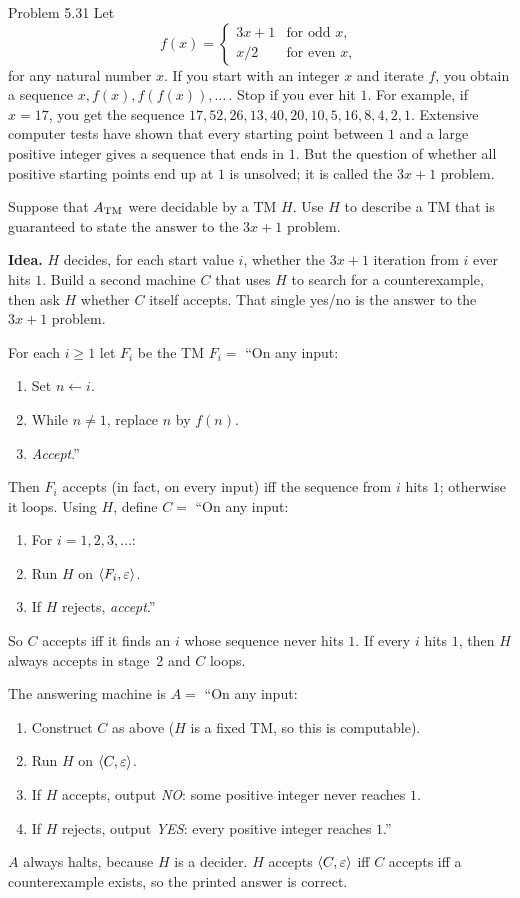 \begin{question}{Problem 5.31}
Let
\[
f(x)=\begin{cases}
3x+1 & \text{for odd }x,\\
x/2 & \text{for even }x,
\end{cases}
\]
for any natural number $x$. If you start with an integer $x$ and iterate $f$, you obtain a sequence $x,f(x),f(f(x)),\ldots$\,. Stop if you ever hit $1$. For example, if $x=17$, you get the sequence $17,52,26,13,40,20,10,5,16,8,4,2,1$. Extensive computer tests have shown that every starting point between $1$ and a large positive integer gives a sequence that ends in $1$. But the question of whether all positive starting points end up at $1$ is unsolved; it is called the $3x+1$ problem.

Suppose that $A_{\mathrm{TM}}$ were decidable by a TM $H$. Use $H$ to describe a TM that is guaranteed to state the answer to the $3x+1$ problem.
\end{question}
\begin{soln}
\textbf{Idea.} $H$ decides, for each start value $i$, whether the $3x+1$ iteration from $i$ ever hits $1$. Build a second machine $C$ that uses $H$ to search for a counterexample, then ask $H$ whether $C$ itself accepts. That single yes/no is the answer to the $3x+1$ problem.

For each $i\ge 1$ let $F_i$ be the TM
$F_i=$ ``On any input:
\begin{enumerate}
\item Set $n\leftarrow i$.
\item While $n\neq 1$, replace $n$ by $f(n)$.
\item \emph{Accept}.''
\end{enumerate}
Then $F_i$ accepts (in fact, on every input) iff the sequence from $i$ hits $1$; otherwise it loops. Using $H$, define
$C=$ ``On any input:
\begin{enumerate}
\item For $i=1,2,3,\ldots$:
\item Run $H$ on $\langle F_i,\varepsilon\rangle$.
\item If $H$ rejects, \emph{accept}.''
\end{enumerate}
So $C$ accepts iff it finds an $i$ whose sequence never hits $1$. If every $i$ hits $1$, then $H$ always accepts in stage~2 and $C$ loops.

The answering machine is
$A=$ ``On any input:
\begin{enumerate}
\item Construct $C$ as above ($H$ is a fixed TM, so this is computable).
\item Run $H$ on $\langle C,\varepsilon\rangle$.
\item If $H$ accepts, output \emph{NO}: some positive integer never reaches $1$.
\item If $H$ rejects, output \emph{YES}: every positive integer reaches $1$.''
\end{enumerate}
$A$ always halts, because $H$ is a decider. $H$ accepts $\langle C,\varepsilon\rangle$ iff $C$ accepts iff a counterexample exists, so the printed answer is correct.
\end{soln}

